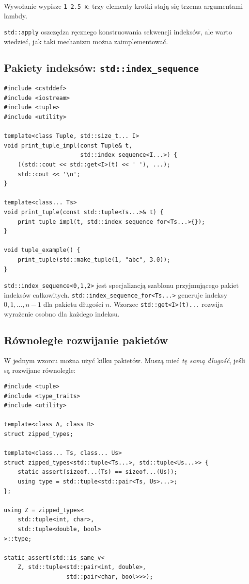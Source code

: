 Wywołanie wypisze \texttt{1 2.5 x}: trzy elementy krotki stają się
trzema argumentami lambdy.

\texttt{std::apply} oszczędza ręcznego konstruowania
sekwencji indeksów, ale warto wiedzieć, jak taki mechanizm
można zaimplementować.

\subsection{Pakiety indeksów: \texttt{std::index\_sequence}}

\begin{lstlisting}
#include <cstddef>
#include <iostream>
#include <tuple>
#include <utility>

template<class Tuple, std::size_t... I>
void print_tuple_impl(const Tuple& t,
                      std::index_sequence<I...>) {
    ((std::cout << std::get<I>(t) << ' '), ...);
    std::cout << '\n';
}

template<class... Ts>
void print_tuple(const std::tuple<Ts...>& t) {
    print_tuple_impl(t, std::index_sequence_for<Ts...>{});
}

void tuple_example() {
    print_tuple(std::make_tuple(1, "abc", 3.0));
}
\end{lstlisting}

\texttt{std::index\_sequence<0,1,2>} jest specjalizacją
szablonu przyjmującego pakiet indeksów całkowitych.
\texttt{std::index\_sequence\_for<Ts...>} generuje indeksy
$0,1,\ldots,n-1$ dla pakietu długości $n$.
Wzorzec \texttt{std::get<I>(t)...} rozwija wyrażenie
osobno dla każdego indeksu.

\subsection{Równoległe rozwijanie pakietów}

W jednym wzorcu można użyć kilku pakietów. Muszą mieć
\emph{tę samą długość}, jeśli są rozwijane równolegle:

\begin{lstlisting}
#include <tuple>
#include <type_traits>
#include <utility>

template<class A, class B>
struct zipped_types;

template<class... Ts, class... Us>
struct zipped_types<std::tuple<Ts...>, std::tuple<Us...>> {
    static_assert(sizeof...(Ts) == sizeof...(Us));
    using type = std::tuple<std::pair<Ts, Us>...>;
};

using Z = zipped_types<
    std::tuple<int, char>,
    std::tuple<double, bool>
>::type;

static_assert(std::is_same_v<
    Z, std::tuple<std::pair<int, double>,
                  std::pair<char, bool>>>);
\end{lstlisting}

